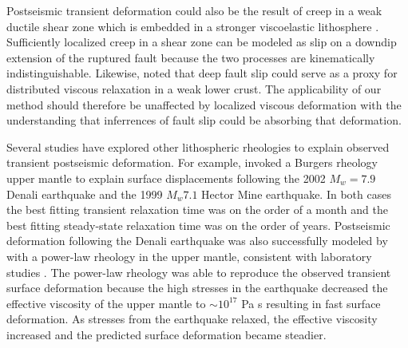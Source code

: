 \documentclass[extra,mreferee]{gji}
\begin{document}
Postseismic transient deformation could also be the result of creep in
a weak ductile shear zone which is embedded in a stronger viscoelastic
lithosphere \citep[e.g][]{HZ2014}. Sufficiently localized creep in a
shear zone can be modeled as slip on a downdip extension of the
ruptured fault \citep[e.g.][]{H2002,KS2003,JS2004} because the two
processes are kinematically indistinguishable.  Likewise,
\citet{F2006} noted that deep fault slip could serve as a proxy for
distributed viscous relaxation in a weak lower crust. The
applicability of our method should therefore be unaffected by
localized viscous deformation with the understanding that inferrences
of fault slip could be absorbing that deformation.

Several studies have explored other lithospheric rheologies to explain
observed transient postseismic deformation.  For example,
\citet{P2003,P2005} invoked a Burgers rheology upper mantle to explain
surface displacements following the 2002 $M_w=7.9$ Denali earthquake
and the 1999 $M_w7.1$ Hector Mine earthquake.  In both cases the best
fitting transient relaxation time was on the order of a month and the
best fitting steady-state relaxation time was on the order of years.
Postseismic deformation following the Denali earthquake was also
successfully modeled by \citet{F2006b} with a power-law rheology in
the upper mantle, consistent with laboratory studies
\citep[e.g.][]{KK1987}.  The power-law rheology was able to reproduce
the observed transient surface deformation because the high stresses
in the earthquake decreased the effective viscosity of the upper
mantle to $\sim10^{17}$ Pa s resulting in fast surface deformation.  As
stresses from the earthquake relaxed, the effective viscosity
increased and the predicted surface deformation became steadier.
\end{document}
